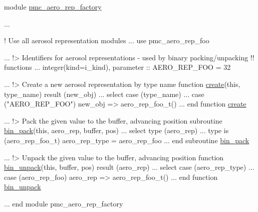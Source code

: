 \begin{DoxyCode}
\textcolor{keyword}{module} \mbox{\hyperlink{namespacepmc__aero__rep__factory}{pmc\_aero\_rep\_factory}}

...

 \textcolor{comment}{! Use all aerosol representation modules}
 ...
 \textcolor{keywordtype}{use }pmc\_aero\_rep\_foo

 ...
\textcolor{comment}{}
\textcolor{comment}{ !> Identifiers for aerosol representations - used by binary packing/unpacking }
\textcolor{comment}{ !! functions}
 ...
 \textcolor{keywordtype}{integer(kind=i\_kind)}, \textcolor{keywordtype}{parameter} :: AERO\_REP\_FOO = 32

 ...
\textcolor{comment}{}
\textcolor{comment}{ !> Create a new aerosol representation by type name}
\textcolor{keyword}{ function }\mbox{\hyperlink{namespacepmc__aero__rep__factory_a72db65ee6fcec381e8315f2de1601953}{create}}(this, type\_name) \textcolor{keyword}{result} (new\_obj)
   ...
   \textcolor{keywordflow}{select case} (type\_name)
     ...
     \textcolor{keywordflow}{case} (\textcolor{stringliteral}{"AERO\_REP\_FOO"})
       new\_obj => aero\_rep\_foo\_t()
   ...
\textcolor{keyword}{ end function }\mbox{\hyperlink{namespacepmc__aero__rep__factory_a72db65ee6fcec381e8315f2de1601953}{create}}

...
\textcolor{comment}{}
\textcolor{comment}{ !> Pack the given value to the buffer, advancing position}
\textcolor{keyword}{ subroutine }\mbox{\hyperlink{namespacepmc__aero__phase__data_a3ee028d1595f33610a4359ddeb5fe249}{bin\_pack}}(this, aero\_rep, buffer, pos)
   ...
   \textcolor{keywordflow}{select type} (aero\_rep)
     ...
\textcolor{keywordflow}{     type is} (aero\_rep\_foo\_t)
       aero\_rep\_type = aero\_rep\_foo
   ...
\textcolor{keyword}{ end subroutine }\mbox{\hyperlink{namespacepmc__aero__phase__data_a3ee028d1595f33610a4359ddeb5fe249}{bin\_pack}}

...
\textcolor{comment}{}
\textcolor{comment}{ !> Unpack the given value to the buffer, advancing position}
\textcolor{keyword}{ function }\mbox{\hyperlink{namespacepmc__aero__phase__data_ab248ad8c703acdfc5f771aaca4671218}{bin\_unpack}}(this, buffer, pos) \textcolor{keyword}{result} (aero\_rep)
   ...
   \textcolor{keywordflow}{select case} (aero\_rep\_type)
     ...
     \textcolor{keywordflow}{case} (aero\_rep\_foo)
       aero\_rep => aero\_rep\_foo\_t()
   ...
\textcolor{keyword}{ end function }\mbox{\hyperlink{namespacepmc__aero__phase__data_ab248ad8c703acdfc5f771aaca4671218}{bin\_unpack}}
 
...
\textcolor{keyword}{end module }pmc\_aero\_rep\_factory
\end{DoxyCode}


